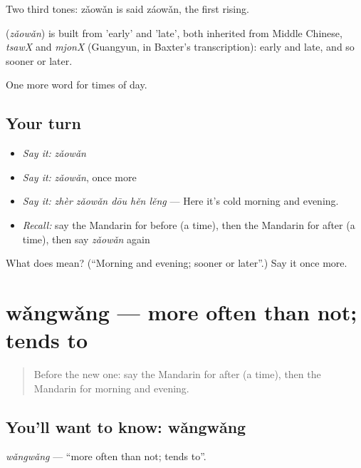 Two third tones: zǎowǎn is said záowǎn, the first rising.

\begin{cousinweb}
\textbf{} (\emph{zǎowǎn}) is built from  'early' and  'late', both inherited from Middle Chinese, \emph{tsawX} and \emph{mjonX} (Guangyun, in Baxter's transcription): early and late, and so sooner or later.
\end{cousinweb}

\begin{grammarlens}[title={What you've built}]
One more word for times of day.
\end{grammarlens}

\subsection*{Your turn}
\begin{itemize}
\raggedright
  \item \emph{Say it:} \emph{zǎowǎn}
  \item \emph{Say it:} \emph{zǎowǎn}, once more
  \item \emph{Say it:} \emph{zhèr zǎowǎn dōu hěn lěng} — Here it's cold morning and evening.
  \item \emph{Recall:} say the Mandarin for before (a time), then the Mandarin for after (a time), then say \emph{zǎowǎn} again
\end{itemize}

\begin{tcolorbox}[breakable,colback=teal!4,colframe=teal!35!black,title={Before you move on}]
What does  mean? (\textquotedblleft{}Morning and evening; sooner or later\textquotedblright{}.) Say it once more.
\end{tcolorbox}
\section[wǎngwǎng]{wǎngwǎng — more often than not; tends to}

\label{lesson:ZH-C185-wangwang}



\begin{quote}
Before the new one: say the Mandarin for after (a time), then the Mandarin for morning and evening.
\end{quote}

\subsection*{You'll want to know: wǎngwǎng}
\emph{wǎngwǎng} — \textquotedblleft{}more often than not; tends to\textquotedblright{}.

